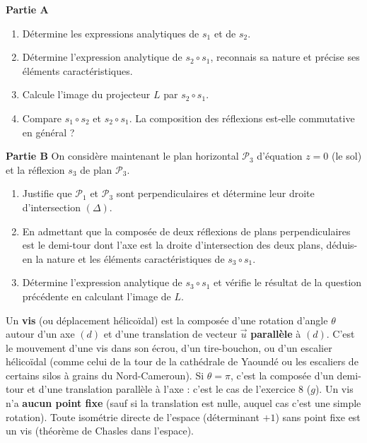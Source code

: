 \documentclass[11pt]{article}
\begin{document}
\begin{exercice}
\textbf{Partie A}
\begin{enumerate}
\item Détermine les expressions analytiques de $s_1$ et de $s_2$.
\item Détermine l'expression analytique de $s_2 \circ s_1$, reconnais sa nature et précise ses éléments caractéristiques.
\item Calcule l'image du projecteur $L$ par $s_2 \circ s_1$.
\item Compare $s_1 \circ s_2$ et $s_2 \circ s_1$. La composition des réflexions est-elle commutative en général ?
\end{enumerate}

\textbf{Partie B}
On considère maintenant le plan horizontal $\mathcal{P}_3$ d'équation $z=0$ (le sol) et la réflexion $s_3$ de plan $\mathcal{P}_3$.
\begin{enumerate}
\item Justifie que $\mathcal{P}_1$ et $\mathcal{P}_3$ sont perpendiculaires et détermine leur droite d'intersection $(\Delta)$.
\item En admettant que la composée de deux réflexions de plans perpendiculaires est le demi-tour dont l'axe est la droite d'intersection des deux plans, déduis-en la nature et les éléments caractéristiques de $s_3 \circ s_1$.
\item Détermine l'expression analytique de $s_3 \circ s_1$ et vérifie le résultat de la question précédente en calculant l'image de $L$.
\end{enumerate}
\end{exercice}

\begin{savaistu}
Un \textbf{vis} (ou déplacement hélicoïdal) est la composée d'une rotation d'angle $\theta$ autour d'un axe $(d)$ et d'une translation de vecteur $\vec{u}$ \textbf{parallèle} à $(d)$. C'est le mouvement d'une vis dans son écrou, d'un tire-bouchon, ou d'un escalier hélicoïdal (comme celui de la tour de la cathédrale de Yaoundé ou les escaliers de certains silos à grains du Nord-Cameroun).
Si $\theta=\pi$, c'est la composée d'un demi-tour et d'une translation parallèle à l'axe : c'est le cas de l'exercice 8 ($g$). Un vis n'a \textbf{aucun point fixe} (sauf si la translation est nulle, auquel cas c'est une simple rotation). Toute isométrie directe de l'espace (déterminant $+1$) sans point fixe est un vis (théorème de Chasles dans l'espace).
\end{savaistu}
\end{document}
